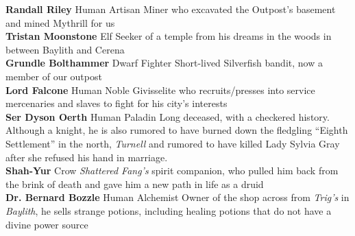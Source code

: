 \documentclass[letterpaper]{article}
\newcommand{\person}[3]{\noindent\textbf{#1
    \ifstrequal{#2}{M}{{\color{ProcessBlue}\male}}{%
    \ifstrequal{#2}{F}{\color{VioletRed}\female}{}}}{\scriptsize #3}}
\begin{document}
\person{Randall Riley}{M}{Human Artisan} Miner who excavated the Outpost's basement and mined Mythrill for us \\
\person{Tristan Moonstone}{M}{Elf} Seeker of a temple from his dreams in the woods in between Baylith and Cerena \\
\person{Grundle Bolthammer}{F}{Dwarf Fighter} Short-lived Silverfish bandit, now a member of our outpost\\
\person{Lord Falcone}{M}{Human Noble} Givisselite who recruits/presses into service mercenaries and slaves to fight for his city's interests\\
\person{Ser Dyson Oerth}{M}{Human Paladin} Long deceased, with a checkered history. Although a knight, he is also rumored to  have burned down the fledgling ``Eighth Settlement'' in the north, \emph{Turnell} and rumored to have killed Lady Sylvia Gray after she refused his hand in marriage.\\
\person{Shah-Yur}{M}{Crow} \emph{Shattered Fang's} spirit companion, who pulled him back from the brink of death and gave him a new path in life as a druid\\
\person{Dr. Bernard Bozzle}{M}{Human Alchemist} Owner of the shop across from \emph{Trig's} in \emph{Baylith}, he sells strange potions, including healing potions that do not have a divine power source\\
\end{document}
